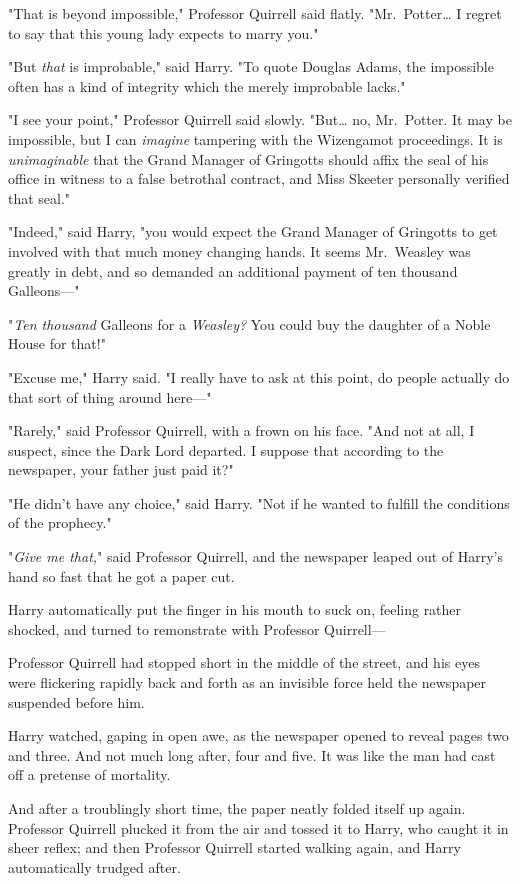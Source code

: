 "That is beyond impossible," Professor Quirrell said flatly. 
"Mr.~Potter{\ldots} I regret to say that this young lady expects to marry you."

"But \emph{that} is improbable," said Harry. "To quote Douglas Adams, the 
impossible often has a kind of integrity which the merely improbable lacks."

"I see your point," Professor Quirrell said slowly. "But{\ldots} no, 
Mr.~Potter. It may be impossible, but I can \emph{imagine} tampering with the 
Wizengamot proceedings. It is \emph{unimaginable} that the Grand Manager of 
Gringotts should affix the seal of his office in witness to a false betrothal 
contract, and Miss Skeeter personally verified that seal."

"Indeed," said Harry, "you would expect the Grand Manager of Gringotts to get 
involved with that much money changing hands. It seems Mr.~Weasley was greatly 
in debt, and so demanded an additional payment of ten thousand Galleons---"

"\emph{Ten thousand} Galleons for a \emph{Weasley?} You could buy the daughter 
of a Noble House for that!"

"Excuse me," Harry said. "I really have to ask at this point, do people 
actually do that sort of thing around here---"

"Rarely," said Professor Quirrell, with a frown on his face. "And not at all, I 
suspect, since the Dark Lord departed. I suppose that according to the 
newspaper, your father just paid it?"

"He didn't have any choice," said Harry. "Not if he wanted to fulfill the 
conditions of the prophecy."

"\emph{Give me that,}" said Professor Quirrell, and the newspaper leaped out of 
Harry's hand so fast that he got a paper cut.

Harry automatically put the finger in his mouth to suck on, feeling rather 
shocked, and turned to remonstrate with Professor Quirrell---

Professor Quirrell had stopped short in the middle of the street, and his eyes 
were flickering rapidly back and forth as an invisible force held the newspaper 
suspended before him.

Harry watched, gaping in open awe, as the newspaper opened to reveal pages two 
and three. And not much long after, four and five. It was like the man had cast 
off a pretense of mortality.

And after a troublingly short time, the paper neatly folded itself up again. 
Professor Quirrell plucked it from the air and tossed it to Harry, who caught 
it in sheer reflex; and then Professor Quirrell started walking again, and 
Harry automatically trudged after.

